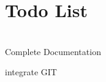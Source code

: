 \chapter{Todo List }
\hypertarget{todo}{}\label{todo}

\begin{DoxyRefList}
\item[Member \doxylink{class_stamp_tool_app_af0fe4dd5973de76b88cc9ebdc126aa61}{Stamp\+Tool\+App\+::Stamp\+Tool\+App} ()]\hfill \\
\label{todo__todo000001}%
%
Complete Documentation

\label{todo__todo000002}%
%
integrate GIT
\end{DoxyRefList}